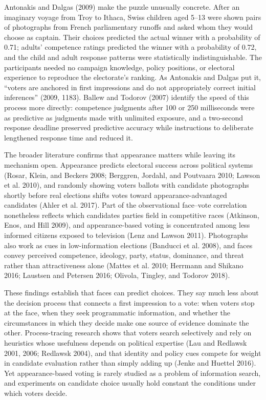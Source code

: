 \documentclass[11pt]{article}\usepackage[]{graphicx}\usepackage[]{xcolor}
\begin{document}
Antonakis and Dalgas (2009) make the puzzle unusually concrete. After an imaginary voyage from Troy to Ithaca, Swiss children aged 5--13 were shown pairs of photographs from French parliamentary runoffs and asked whom they would choose as captain. Their choices predicted the actual winner with a probability of 0.71; adults' competence ratings predicted the winner with a probability of 0.72, and the child and adult response patterns were statistically indistinguishable. The participants needed no campaign knowledge, policy positions, or electoral experience to reproduce the electorate's ranking. As Antonakis and Dalgas put it, ``voters are anchored in first impressions and do not appropriately correct initial inferences'' (2009, 1183). Ballew and Todorov (2007) identify the speed of this process more directly: competence judgments after 100 or 250 milliseconds were as predictive as judgments made with unlimited exposure, and a two-second response deadline preserved predictive accuracy while instructions to deliberate lengthened response time and reduced it.

The broader literature confirms that appearance matters while leaving its mechanism open. Appearance predicts electoral success across political systems (Rosar, Klein, and Beckers 2008; Berggren, Jordahl, and Poutvaara 2010; Lawson et al. 2010), and randomly showing voters ballots with candidate photographs shortly before real elections shifts votes toward appearance-advantaged candidates (Ahler et al. 2017). Part of the observational face--vote correlation nonetheless reflects which candidates parties field in competitive races (Atkinson, Enos, and Hill 2009), and appearance-based voting is concentrated among less informed citizens exposed to television (Lenz and Lawson 2011). Photographs also work as cues in low-information elections (Banducci et al. 2008), and faces convey perceived competence, ideology, party, status, dominance, and threat rather than attractiveness alone (Mattes et al. 2010; Herrmann and Shikano 2016; Laustsen and Petersen 2016; Olivola, Tingley, and Todorov 2018).

These findings establish that faces can predict choices. They say much less about the decision process that connects a first impression to a vote: when voters stop at the face, when they seek programmatic information, and whether the circumstances in which they decide make one source of evidence dominate the other. Process-tracing research shows that voters search selectively and rely on heuristics whose usefulness depends on political expertise (Lau and Redlawsk 2001, 2006; Redlawsk 2004), and that identity and policy cues compete for weight in candidate evaluation rather than simply adding up (Jenke and Huettel 2016). Yet appearance-based voting is rarely studied as a problem of information search, and experiments on candidate choice usually hold constant the conditions under which voters decide.
\end{document}
